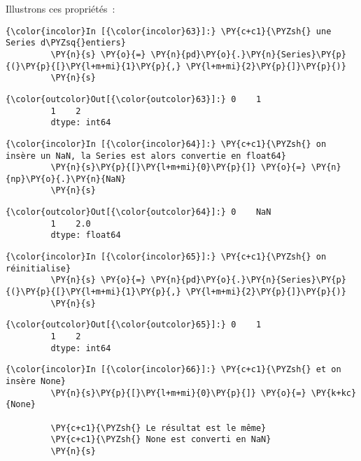 Illustrons ces propriétés~:

    \begin{Verbatim}[commandchars=\\\{\}]
{\color{incolor}In [{\color{incolor}63}]:} \PY{c+c1}{\PYZsh{} une Series d\PYZsq{}entiers}
         \PY{n}{s} \PY{o}{=} \PY{n}{pd}\PY{o}{.}\PY{n}{Series}\PY{p}{(}\PY{p}{[}\PY{l+m+mi}{1}\PY{p}{,} \PY{l+m+mi}{2}\PY{p}{]}\PY{p}{)}
         \PY{n}{s}
\end{Verbatim}


\begin{Verbatim}[commandchars=\\\{\}]
{\color{outcolor}Out[{\color{outcolor}63}]:} 0    1
         1    2
         dtype: int64
\end{Verbatim}
            
    \begin{Verbatim}[commandchars=\\\{\}]
{\color{incolor}In [{\color{incolor}64}]:} \PY{c+c1}{\PYZsh{} on insère un NaN, la Series est alors convertie en float64}
         \PY{n}{s}\PY{p}{[}\PY{l+m+mi}{0}\PY{p}{]} \PY{o}{=} \PY{n}{np}\PY{o}{.}\PY{n}{NaN}
         \PY{n}{s}
\end{Verbatim}


\begin{Verbatim}[commandchars=\\\{\}]
{\color{outcolor}Out[{\color{outcolor}64}]:} 0    NaN
         1    2.0
         dtype: float64
\end{Verbatim}
            
    \begin{Verbatim}[commandchars=\\\{\}]
{\color{incolor}In [{\color{incolor}65}]:} \PY{c+c1}{\PYZsh{} on réinitialise}
         \PY{n}{s} \PY{o}{=} \PY{n}{pd}\PY{o}{.}\PY{n}{Series}\PY{p}{(}\PY{p}{[}\PY{l+m+mi}{1}\PY{p}{,} \PY{l+m+mi}{2}\PY{p}{]}\PY{p}{)}
         \PY{n}{s}
\end{Verbatim}


\begin{Verbatim}[commandchars=\\\{\}]
{\color{outcolor}Out[{\color{outcolor}65}]:} 0    1
         1    2
         dtype: int64
\end{Verbatim}
            
    \begin{Verbatim}[commandchars=\\\{\}]
{\color{incolor}In [{\color{incolor}66}]:} \PY{c+c1}{\PYZsh{} et on insère None}
         \PY{n}{s}\PY{p}{[}\PY{l+m+mi}{0}\PY{p}{]} \PY{o}{=} \PY{k+kc}{None}
         
         \PY{c+c1}{\PYZsh{} Le résultat est le même}
         \PY{c+c1}{\PYZsh{} None est converti en NaN}
         \PY{n}{s}
\end{Verbatim}


